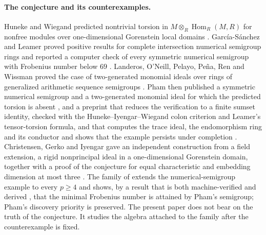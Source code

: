 \documentclass[11pt]{article}
\theoremstyle{definition}
\theoremstyle{remark}
\begin{document}
\paragraph{The conjecture and its counterexamples.}
Huneke and Wiegand predicted nontrivial torsion in $M\otimes_R\operatorname{Hom}_R(M,R)$ for
nonfree modules over one-dimensional Gorenstein local domains \cite{HunekeWiegand1994}.
Garc\'ia-S\'anchez and Leamer proved positive results for complete intersection numerical
semigroup rings and reported a computer check of every symmetric numerical semigroup with
Frobenius number below $69$ \cite{GarciaSanchezLeamer2013}. Landeros, O'Neill, Pelayo, Pe\~na,
Ren and Wissman proved the case of two-generated monomial ideals over rings of generalized
arithmetic sequence semigroups \cite{Landeros2024}. Pham then published a symmetric numerical
semigroup and a two-generated monomial ideal for which the predicted torsion is absent
\cite{Pham2026}, and a preprint that reduces the verification to a finite sumset identity,
checked with the Huneke--Iyengar--Wiegand colon criterion and Leamer's tensor-torsion formula,
and that computes the trace ideal, the endomorphism ring and its conductor and shows that the
example persists under completion \cite{PhamArxiv2026}. Christensen, Gerko and Iyengar gave an
independent construction from a field extension, a rigid nonprincipal ideal in a
one-dimensional Gorenstein domain, together with a proof of the conjecture for equal
characteristic and embedding dimension at most three \cite{CGI2026}. The family of
\cite{SantibanezLeal2026} extends the numerical-semigroup example to every $p\geq4$ and shows,
by a result that is both machine-verified and derived \cite[Theorem~6.1]{SantibanezLeal2026},
that the minimal Frobenius number is attained by Pham's semigroup; Pham's discovery priority is
preserved. The present paper does not bear on the truth of the conjecture. It studies the
algebra attached to the family after the counterexample is fixed.
\end{document}
